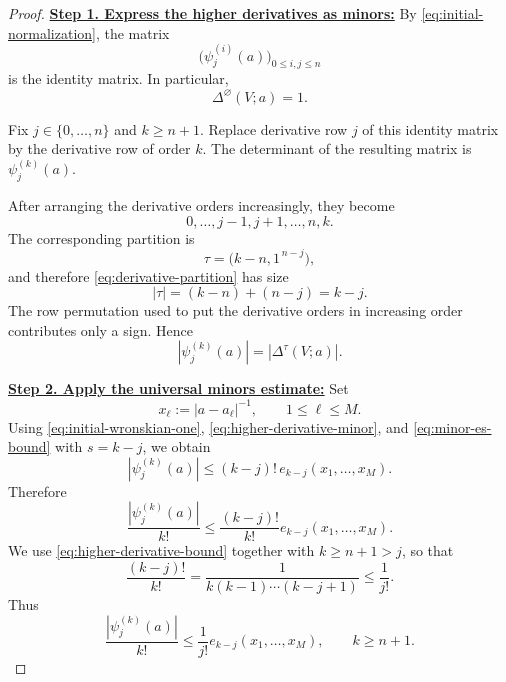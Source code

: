 \documentclass[12pt,letterpaper,reqno]{amsart}
\theoremstyle{definition}
\numberwithin{equation}{section}
\begin{document}
\begin{proof}

\medskip\noindent
\textbf{\underline{Step 1. Express the higher derivatives as minors:}}
By \eqref{eq:initial-normalization}, the matrix
\[
\bigl(\psi_j^{(i)}(a)\bigr)_{0\leq i,j\leq n}
\]
is the identity matrix. In particular,
\begin{equation}\label{eq:initial-wronskian-one}
 \Delta^\varnothing(V;a)=1.
\end{equation}

Fix \(j\in\{0,\ldots,n\}\) and \(k\geq n+1\). Replace derivative row
\(j\) of this identity matrix by the derivative row of order \(k\).
The determinant of the resulting matrix is
\(\psi_j^{(k)}(a)\).

After arranging the derivative orders increasingly, they become
\[
0,\ldots,j-1,j+1,\ldots,n,k.
\]
The corresponding partition is
\begin{equation}\label{eq:derivative-partition}
 \tau=
 \bigl(k-n,1^{\,n-j}\bigr),
\end{equation}
and therefore \eqref{eq:derivative-partition} has size
\[
|\tau|
=
(k-n)+(n-j)
=
k-j.
\]
The row permutation used to put the derivative orders in increasing
order contributes only a sign. Hence
\begin{equation}\label{eq:higher-derivative-minor}
 |\psi_j^{(k)}(a)|
 =
 |\Delta^\tau(V;a)|.
\end{equation}

\medskip\noindent
\textbf{\underline{Step 2. Apply the universal minors estimate:}}
Set
\[
x_\ell:=|a-a_\ell|^{-1},
\qquad
1\leq\ell\leq M.
\]
Using \eqref{eq:initial-wronskian-one},
\eqref{eq:higher-derivative-minor}, and
\eqref{eq:minor-es-bound} with \(s=k-j\), we obtain
\[
|\psi_j^{(k)}(a)|
\leq
(k-j)!\,
e_{k-j}(x_1,\ldots,x_M).
\]
Therefore
\begin{equation}\label{eq:higher-derivative-bound}
 \frac{|\psi_j^{(k)}(a)|}{k!}
 \leq
 \frac{(k-j)!}{k!}
 e_{k-j}(x_1,\ldots,x_M).
\end{equation}
We use \eqref{eq:higher-derivative-bound} together with
\(k\geq n+1>j\), so that
\[
\frac{(k-j)!}{k!}
=
\frac1{k(k-1)\cdots(k-j+1)}
\leq
\frac1{j!}.
\]
Thus
\begin{equation}\label{eq:higher-derivative-simple}
 \frac{|\psi_j^{(k)}(a)|}{k!}
 \leq
 \frac1{j!}
 e_{k-j}(x_1,\ldots,x_M),
 \qquad k\geq n+1.
\end{equation}


\end{proof}
\end{document}
